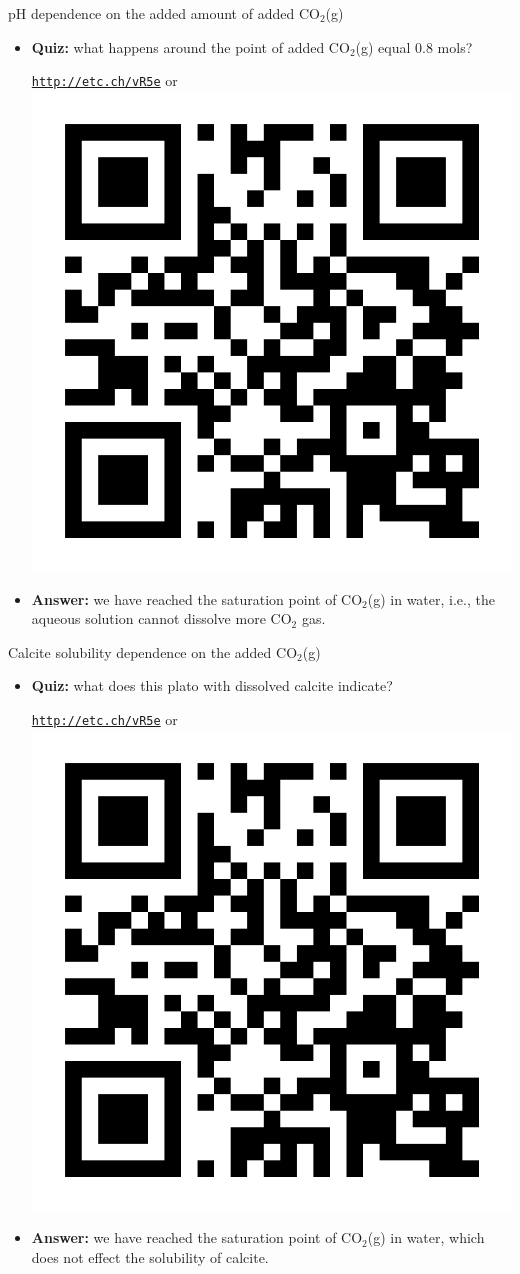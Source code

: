 \begin{frame}{pH dependence on the added amount of added CO$_2$(g)}
	\small
	\begin{itemize}

		\item \alert{\textbf{Quiz:}} what happens around the point of added CO$_2$(g) equal 0.8 mols?\\[5pt]
		\vskip 10pt
		\begin{center}
			\href{http://etc.ch/vR5e}{\textcolor{indigo(dye)}{\tt http://etc.ch/vR5e}} \quad or \quad 
			\includegraphics[height=0.18\columnwidth]{figures/computational-projects/polls.png}
		\end{center}
		\vskip 10pt
		\hiddenpause
		\vskip 10pt
		\item {\textbf{Answer:}} we have reached the saturation point of CO$_2$(g) in water, i.e., the aqueous solution cannot dissolve more CO$_2$ gas.
		\end{itemize}
\end{frame}

\begin{frame}{Calcite solubility dependence on the added CO$_2$(g)}
	\small
	\begin{itemize}
		
		\item \alert{\textbf{Quiz:}} what does this plato with dissolved calcite indicate? \\[5pt]
		\vskip 10pt
		\begin{center}
			\href{http://etc.ch/vR5e}{\textcolor{indigo(dye)}{\tt http://etc.ch/vR5e}} \quad or \quad 
			\includegraphics[height=0.18\columnwidth]{figures/computational-projects/polls.png}
		\end{center}
		\vskip 10pt
		\hiddenpause
		\vskip 10pt
		\item {\textbf{Answer:}} we have reached the saturation point of CO$_2$(g) in water, which does not effect the solubility of calcite.
	\end{itemize}
\end{frame}